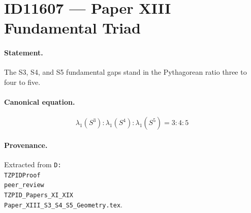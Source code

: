 \section*{ID11607 --- Paper XIII Fundamental Triad}

\paragraph{Statement.}
The S3, S4, and S5 fundamental gaps stand in the Pythagorean ratio three to four to five.

\paragraph{Canonical equation.}
\[
\lambda_1(S^3):\lambda_1(S^4):\lambda_1(S^5)=3:4:5
\]

\paragraph{Provenance.}
Extracted from \texttt{D:\\TZPIDProof\\peer\_review\\TZPID\_Papers\_XI\_XIX\\Paper\_XIII\_S3\_S4\_S5\_Geometry.tex}.

